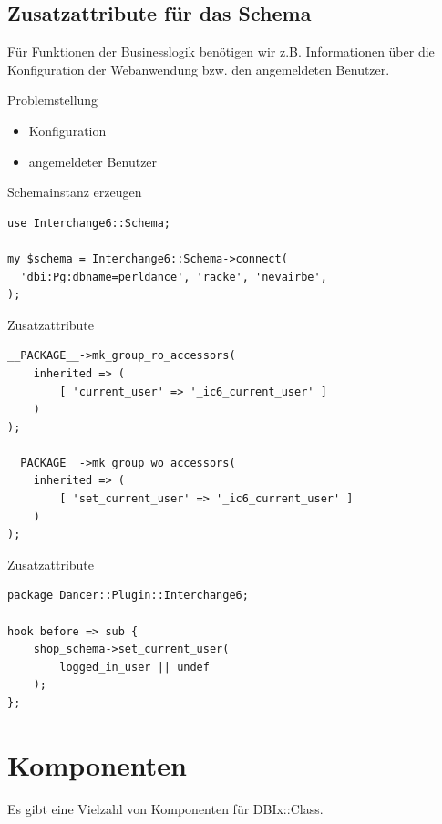 \subsection{Zusatzattribute für das Schema}

Für Funktionen der Businesslogik benötigen wir z.B.
Informationen über die Konfiguration der Webanwendung
bzw. den angemeldeten Benutzer.

\begin{frame}{Problemstellung}
\begin{itemize}
\item Konfiguration
\item angemeldeter Benutzer
\end{itemize}
\end{frame}

\begin{frame}[fragile]{Schemainstanz erzeugen}
\begin{lstlisting}
use Interchange6::Schema;

my $schema = Interchange6::Schema->connect(
  'dbi:Pg:dbname=perldance', 'racke', 'nevairbe', 
);
\end{lstlisting}
\end{frame}

\begin{frame}[fragile]{Zusatzattribute}
\begin{lstlisting}
__PACKAGE__->mk_group_ro_accessors(
    inherited => (
        [ 'current_user' => '_ic6_current_user' ]
    )
);

__PACKAGE__->mk_group_wo_accessors(
    inherited => (
        [ 'set_current_user' => '_ic6_current_user' ]
    )
);
\end{lstlisting}
\end{frame}

\begin{frame}[fragile]{Zusatzattribute}
\begin{lstlisting}
package Dancer::Plugin::Interchange6;

hook before => sub {
    shop_schema->set_current_user(
        logged_in_user || undef
    );
};

\end{lstlisting}
\end{frame}

\section{Komponenten}

Es gibt eine Vielzahl von Komponenten für DBIx::Class.

